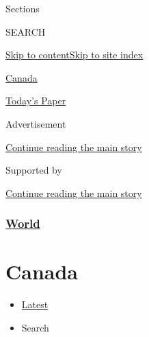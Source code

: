 Sections

SEARCH

\protect\hyperlink{site-content}{Skip to
content}\protect\hyperlink{site-index}{Skip to site index}

\href{https://www.nytimes3xbfgragh.onion/section/world/canada}{Canada}

\href{https://myaccount.nytimes3xbfgragh.onion/auth/login?response_type=cookie\&client_id=vi}{}

\href{https://www.nytimes3xbfgragh.onion/section/todayspaper}{Today's
Paper}

Advertisement

\protect\hyperlink{after-top}{Continue reading the main story}

Supported by

\protect\hyperlink{after-sponsor}{Continue reading the main story}

\hypertarget{world}{%
\subsubsection{\texorpdfstring{\href{/section/world}{World}}{World}}\label{world}}

\hypertarget{canada}{%
\section{Canada}\label{canada}}

\begin{itemize}
\tightlist
\item
  \protect\hyperlink{stream-panel}{Latest}
\item
  Search
\end{itemize}

